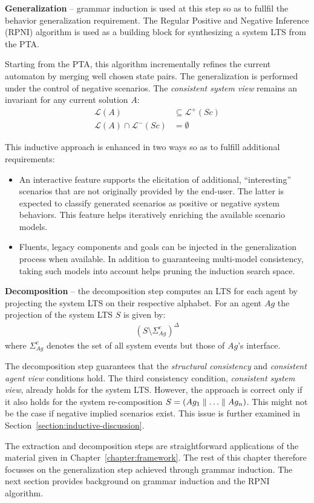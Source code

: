 \noindent \textbf{Generalization} -- grammar induction is used at this step so as to fullfil the behavior generalization requirement. The Regular Positive and Negative Inference (RPNI) algorithm is used as a building block \cite{Oncina:1992} for synthesizing a system LTS from the PTA.

Starting from the PTA, this algorithm incrementally refines the current automaton by merging well chosen state pairs. The generalization is performed under the control of negative scenarios. The \emph{consistent system view} remains an invariant for any current solution $A$:
\begin{align*}
\mathcal{L}(A) &\subseteq \mathcal{L}^+(Sc)\\
\mathcal{L}(A) \cap \mathcal{L}^-(Sc) &= \emptyset
\end{align*}

This inductive approach is enhanced in two ways so as to fulfill additional requirements:

\begin{itemize}

\item An interactive feature supports the elicitation of additional, ``interesting'' scenarios that are not originally provided by the end-user. The latter is expected to classify generated scenarios as positive or negative system behaviors. This feature helps iteratively enriching the available scenario models.

\item Fluents, legacy components and goals can be injected in the generalization process when available. In addition to guaranteeing multi-model consistency, taking such models into account helps pruning the induction search space.

\end{itemize}

\noindent \textbf{Decomposition} -- the decomposition step computes an LTS for each agent by projecting the system LTS on their respective alphabet. For an agent $Ag$ the projection of the system LTS $S$ is given by:
\begin{align}
(S \setminus \Sigma_{Ag}^c)^\Delta
\end{align}
\noindent where $\Sigma_{Ag}^c$ denotes the set of all system events but those of $Ag$'s interface.

The decomposition step guarantees that the \emph{structural consistency} and \emph{consistent agent view} conditions hold. The third consistency condition, \emph{consistent system view}, already holds for the system LTS. However, the approach is correct only if it also holds for the system re-composition $S = (Ag_1 \parallel \ldots \parallel Ag_n)$. This might not be the case if negative implied scenarios exist. This issue is further examined in Section~\ref{section:inductive-discussion}.

The extraction and decomposition steps are straightforward applications of the material given in Chapter~\ref{chapter:framework}. The rest of this chapter therefore focusses on the generalization step achieved through grammar induction. The next section provides background on grammar induction and the RPNI algorithm.
